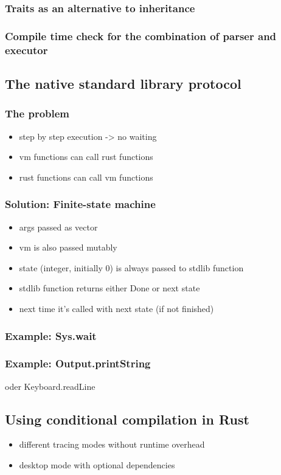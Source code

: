 \subsubsection{Traits as an alternative to inheritance}
\subsubsection{Compile time check for the combination of parser and executor}
\subsection{The native standard library protocol} \label{jack-stdlib-in-rust}
\subsubsection{The problem}
\begin{itemize}
  \item step by step execution -> no waiting
  \item vm functions can call rust functions
  \item rust functions can call vm functions
\end{itemize}
\subsubsection{Solution: Finite-state machine}
\begin{itemize}
  \item args passed as vector
  \item vm is also passed mutably
  \item state (integer, initially 0) is always passed to stdlib function
  \item stdlib function returns either Done or next state
  \item next time it's called with next state (if not finished)
\end{itemize}
\subsubsection{Example: Sys.wait}
\subsubsection{Example: Output.printString}
oder Keyboard.readLine
\subsection{Using conditional compilation in Rust} \label{conditional-compilation}
\begin{itemize}
  \item different tracing modes without runtime overhead
  \item desktop mode with optional dependencies
\end{itemize}
